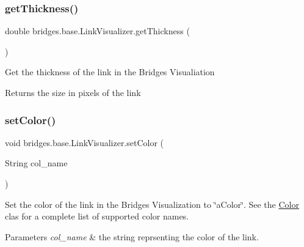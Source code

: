 \subsubsection{\texorpdfstring{get\+Thickness()}{getThickness()}}
{\footnotesize\ttfamily double bridges.\+base.\+Link\+Visualizer.\+get\+Thickness (\begin{DoxyParamCaption}{ }\end{DoxyParamCaption})}

Get the thickness of the link in the Bridges Visualiation

\begin{DoxyReturn}{Returns}
the size in pixels of the link 
\end{DoxyReturn}
\mbox{\label{classbridges_1_1base_1_1_link_visualizer_a92f306dbd73b961befa8ab4c0620a89e}} 
\subsubsection{\texorpdfstring{set\+Color()}{setColor()}\hspace{0.1cm}{\footnotesize\ttfamily [1/3]}}
{\footnotesize\ttfamily void bridges.\+base.\+Link\+Visualizer.\+set\+Color (\begin{DoxyParamCaption}\item[{String}]{col\+\_\+name }\end{DoxyParamCaption})}

Set the color of the link in the Bridges Visualization to \char`\"{}a\+Color\char`\"{}. See the \hyperlink{classbridges_1_1base_1_1_color}{Color} clas for a complete list of supported color names.


\begin{DoxyParams}{Parameters}
{\em col\+\_\+name} & the string reprsenting the color of the link. \\
\hline
\end{DoxyParams}
\mbox{\label{classbridges_1_1base_1_1_link_visualizer_ab05a7576f99818937276a4937eedeee1}} 

